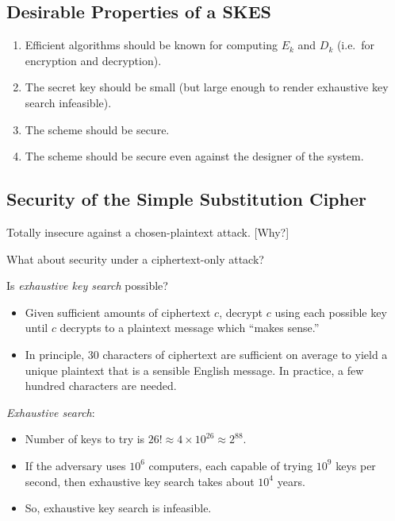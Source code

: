 \subsection*{Desirable Properties of a SKES}
\begin{enumerate}
      \item Efficient algorithms should be known for computing $E_{k}$
            and $D_{k}$ (i.e.\ for encryption and decryption).
      \item The secret key should be small (but large enough to render exhaustive
            key search infeasible).
      \item The scheme should be secure.
      \item The scheme should be secure even against the designer of the system.
\end{enumerate}

\subsection*{Security of the Simple Substitution Cipher}
Totally insecure against a chosen-plaintext attack. [Why?]

What about security under a ciphertext-only attack?

Is \emph{exhaustive key search} possible?
\begin{itemize}
      \item  Given sufficient amounts of
            ciphertext $c$, decrypt $c$ using each possible key
            until $c$ decrypts to a plaintext message which ``makes sense.''
      \item In principle, 30 characters of ciphertext are sufficient
            on average to yield a unique plaintext that is a sensible
            English message. In practice, a few hundred characters are needed.
\end{itemize}
\emph{Exhaustive search}:
\begin{itemize}
      \item Number of keys to try is
            $26 ! \approx 4 \times 10^{26} \approx 2^{88}$.
      \item If the adversary uses $10^{6}$ computers, each
            capable of trying $10^{9}$ keys per second, then
            exhaustive key search takes about $10^{4}$ years.
      \item So, exhaustive key search is infeasible.
\end{itemize}

